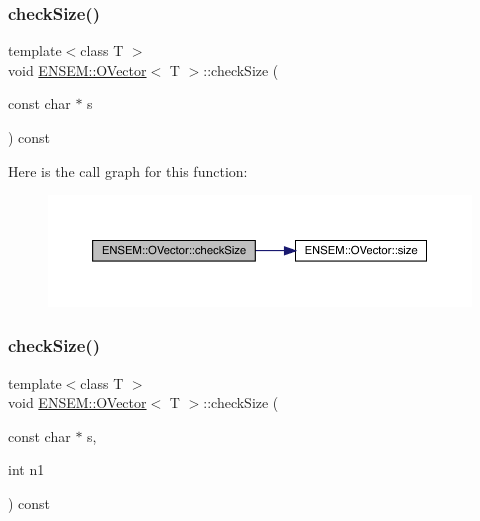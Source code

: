 \subsubsection{\texorpdfstring{checkSize()}{checkSize()}\hspace{0.1cm}{\footnotesize\ttfamily [2/4]}}
{\footnotesize\ttfamily template$<$class T $>$ \\
void \mbox{\hyperlink{classENSEM_1_1OVector}{E\+N\+S\+E\+M\+::\+O\+Vector}}$<$ T $>$\+::check\+Size (\begin{DoxyParamCaption}\item[{const char $\ast$}]{s }\end{DoxyParamCaption}) const\hspace{0.3cm}{\ttfamily [inline]}}

Here is the call graph for this function\+:
\nopagebreak
\begin{figure}[H]
\begin{center}
\leavevmode
\includegraphics[width=350pt]{d0/d8d/classENSEM_1_1OVector_a12d09a71bb2808a7404578da9ba41c4f_cgraph}
\end{center}
\end{figure}
\mbox{\label{classENSEM_1_1OVector_a1446ad09778db3a287fb5f6fec304b22}} 
\subsubsection{\texorpdfstring{checkSize()}{checkSize()}\hspace{0.1cm}{\footnotesize\ttfamily [3/4]}}
{\footnotesize\ttfamily template$<$class T $>$ \\
void \mbox{\hyperlink{classENSEM_1_1OVector}{E\+N\+S\+E\+M\+::\+O\+Vector}}$<$ T $>$\+::check\+Size (\begin{DoxyParamCaption}\item[{const char $\ast$}]{s,  }\item[{int}]{n1 }\end{DoxyParamCaption}) const\hspace{0.3cm}{\ttfamily [inline]}}

